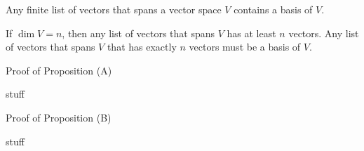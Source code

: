 {} Any finite list of vectors that spans a vector space $V$ contains a basis of $V$.  

{} If $\dim V = n$, then any list of vectors that spans $V$ has
at least $n$ vectors.  Any  list of vectors that spans $V$ that has exactly $n$ vectors must
be a basis of $V$.  


\begin{edXshowhide}{Proof of Proposition (A)}

stuff

\end{edXshowhide}


\begin{edXshowhide}{Proof of Proposition (B)}

stuff

\end{edXshowhide}



\endedxtext

\endedxvertical

